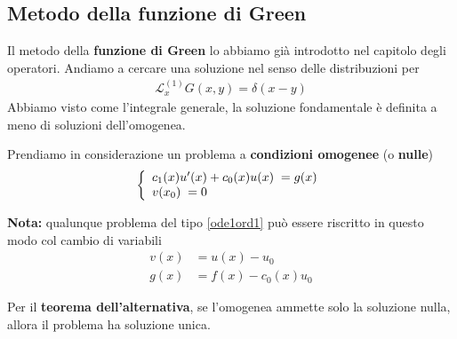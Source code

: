 \subsection{Metodo della funzione di Green} 
Il metodo della \textbf{funzione di Green} lo abbiamo già introdotto nel capitolo degli operatori. Andiamo a cercare una soluzione nel senso delle distribuzioni per
\begin{align}
	\mathcal{L}^{(1)}_x G(x,y) = \delta(x-y) \label{green1}
\end{align}
Abbiamo visto come l'integrale generale, la soluzione fondamentale è definita a meno di soluzioni dell'omogenea. 

Prendiamo in considerazione un problema a \textbf{condizioni omogenee} (o \textbf{nulle})
\begin{align}
	\left\{\begin{array}{c}
		c_1 (x) u'(x) + c_0(x) u(x) \; = g(x) \hfill \\
		v(x_0) \;  = 0 \hfill 
	\end{array}
	\right.
\end{align}

\textbf{Nota:} qualunque problema del tipo \ref{ode1ord1} può essere riscritto in questo modo col cambio di variabili
\begin{align}
	v(x) &= u(x) - u_0\\
	g(x) &= f(x) - c_0(x)u_0
\end{align}

Per il \textbf{teorema dell'alternativa}, se l'omogenea ammette solo la soluzione nulla, allora il problema ha soluzione unica.

